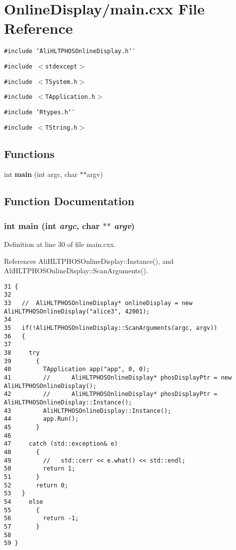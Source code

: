 \section{Online\-Display/main.cxx File Reference}
\label{main_8cxx}


{\tt \#include \char`\"{}Ali\-HLTPHOSOnline\-Display.h\char`\"{}}\par
{\tt \#include $<$stdexcept$>$}\par
{\tt \#include $<$TSystem.h$>$}\par
{\tt \#include $<$TApplication.h$>$}\par
{\tt \#include \char`\"{}Rtypes.h\char`\"{}}\par
{\tt \#include $<$TString.h$>$}\par
\subsection*{Functions}
\begin{CompactItemize}
\item 
int {\bf main} (int argc, char $\ast$$\ast$argv)
\end{CompactItemize}


\subsection{Function Documentation}
\subsubsection{\setlength{\rightskip}{0pt plus 5cm}int main (int {\em argc}, char $\ast$$\ast$ {\em argv})}\label{main_8cxx_a0}




Definition at line 30 of file main.cxx.

References Ali\-HLTPHOSOnline\-Display::Instance(), and Ali\-HLTPHOSOnline\-Display::Scan\-Arguments().

\footnotesize\begin{verbatim}31 {
32 
33   //  AliHLTPHOSOnlineDisplay* onlineDisplay = new AliHLTPHOSOnlineDisplay("alice3", 42001); 
34   
35   if(!AliHLTPHOSOnlineDisplay::ScanArguments(argc, argv))
36   {
37     
38     try 
39       {
40         TApplication app("app", 0, 0);
41         //      AliHLTPHOSOnlineDisplay* phosDisplayPtr = new AliHLTPHOSOnlineDisplay();
42         //      AliHLTPHOSOnlineDisplay* phosDisplayPtr = AliHLTPHOSOnlineDisplay::Instance();
43         AliHLTPHOSOnlineDisplay::Instance();
44         app.Run();
45       }
46     
47     catch (std::exception& e)
48       {
49         //   std::cerr << e.what() << std::endl;
50         return 1;
51       }
52       return 0;
53   }
54     else
55       {
56         return -1;
57       }
58   
59 }
\end{verbatim}\normalsize 


